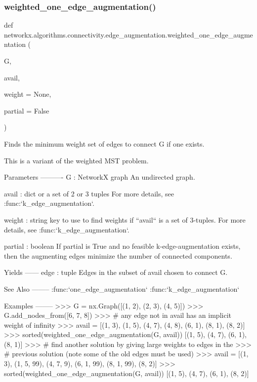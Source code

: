  \mbox{\label{namespacenetworkx_1_1algorithms_1_1connectivity_1_1edge__augmentation_a2c1f6911ffedbdeb793f0a79f976b96c}} 
\subsubsection{\texorpdfstring{weighted\+\_\+one\+\_\+edge\+\_\+augmentation()}{weighted\_one\_edge\_augmentation()}}
{\footnotesize\ttfamily def networkx.\+algorithms.\+connectivity.\+edge\+\_\+augmentation.\+weighted\+\_\+one\+\_\+edge\+\_\+augmentation (\begin{DoxyParamCaption}\item[{}]{G,  }\item[{}]{avail,  }\item[{}]{weight = {\ttfamily None},  }\item[{}]{partial = {\ttfamily False} }\end{DoxyParamCaption})}

\begin{DoxyVerb}Finds the minimum weight set of edges to connect G if one exists.

This is a variant of the weighted MST problem.

Parameters
----------
G : NetworkX graph
   An undirected graph.

avail : dict or a set of 2 or 3 tuples
    For more details, see :func:`k_edge_augmentation`.

weight : string
    key to use to find weights if ``avail`` is a set of 3-tuples.
    For more details, see :func:`k_edge_augmentation`.

partial : boolean
    If partial is True and no feasible k-edge-augmentation exists, then the
    augmenting edges minimize the number of connected components.

Yields
------
edge : tuple
    Edges in the subset of avail chosen to connect G.

See Also
--------
:func:`one_edge_augmentation`
:func:`k_edge_augmentation`

Examples
--------
>>> G = nx.Graph([(1, 2), (2, 3), (4, 5)])
>>> G.add_nodes_from([6, 7, 8])
>>> # any edge not in avail has an implicit weight of infinity
>>> avail = [(1, 3), (1, 5), (4, 7), (4, 8), (6, 1), (8, 1), (8, 2)]
>>> sorted(weighted_one_edge_augmentation(G, avail))
[(1, 5), (4, 7), (6, 1), (8, 1)]
>>> # find another solution by giving large weights to edges in the
>>> # previous solution (note some of the old edges must be used)
>>> avail = [(1, 3), (1, 5, 99), (4, 7, 9), (6, 1, 99), (8, 1, 99), (8, 2)]
>>> sorted(weighted_one_edge_augmentation(G, avail))
[(1, 5), (4, 7), (6, 1), (8, 2)]
\end{DoxyVerb}
 

